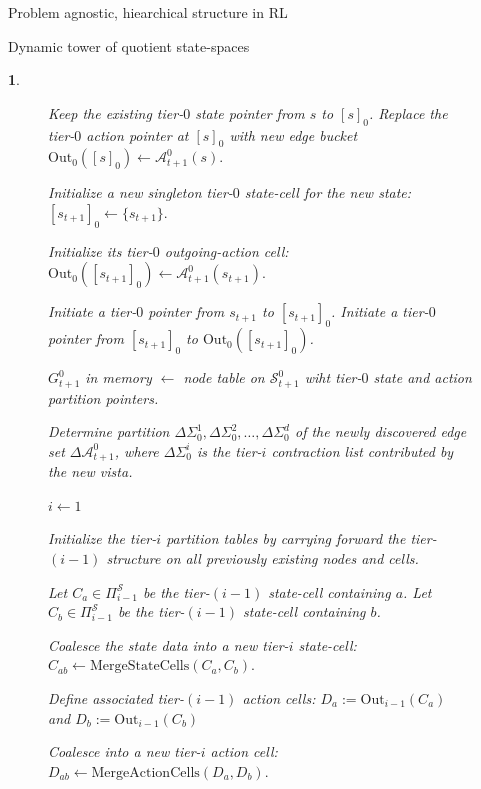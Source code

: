 \documentclass[11pt]{article}
\newtheorem{ermark}[subsubsection]{}
\begin{document}
\begin{section}{Problem agnostic, hiearchical structure in RL}
\begin{subsection}{Dynamic tower of quotient state-spaces}
\begin{ermark}
\begin{figure}[!h]
\begin{algorithm}[H]
\begin{algorithmic}[1]
        \State Keep the existing tier-$0$ state pointer from $s$ to $[s]_0$.
        \State Replace the tier-$0$ action pointer at $[s]_0$ with new edge bucket
        $
        \mathrm{Out}_0([s]_0)\gets \mathcal{A}_{t+1}^0(s).
        $
    \EndFor

    \State Initialize a new singleton tier-$0$ state-cell for the new state:
    $
    [s_{t+1}]_0\gets \{s_{t+1}\}.
    $

    \State Initialize its tier-$0$ outgoing-action cell:
    $
    \mathrm{Out}_0([s_{t+1}]_0)\gets \mathcal{A}_{t+1}^0(s_{t+1}).
    $

    \State Initiate a tier-$0$ pointer from $s_{t+1}$ to $[s_{t+1}]_0$.
    \State Initiate a tier-$0$ pointer from $[s_{t+1}]_0$ to $\mathrm{Out}_0([s_{t+1}]_0)$.

    \State $G_{t+1}^0$ in memory $\gets$ node table on $\mathcal{S}_{t+1}^0$ wiht tier-$0$ state and action partition pointers.

    \State Determine partition
    $
    \Delta\Sigma_0^1,\Delta\Sigma_0^2,\dots,\Delta\Sigma_0^d
    $
    of the newly discovered edge set $\Delta\mathcal{A}_{t+1}^0$, where $\Delta\Sigma_0^i$ is the tier-$i$ contraction list contributed by the new vista.


    \State $i \gets 1$

        \State Initialize the tier-$i$ partition tables by carrying forward the tier-$(i-1)$ structure on all previously existing nodes and cells.

            \State Let $C_a\in\Pi_{i-1}^{\mathcal S}$ be the tier-$(i-1)$ state-cell containing $a$.
            \State Let $C_b\in\Pi_{i-1}^{\mathcal S}$ be the tier-$(i-1)$ state-cell containing $b$.

                \State Coalesce the state data into a new tier-$i$ state-cell:
                $
                C_{ab}\gets \mathrm{MergeStateCells}(C_a,C_b).
                $

                \State Define associated tier-$(i-1)$ action cells: $D_a:=\mathrm{Out}_{i-1}(C_a)$ and $D_b:=\mathrm{Out}_{i-1}(C_b)$

                \State Coalesce into a new tier-$i$ action cell:
                $
                D_{ab}\gets \mathrm{MergeActionCells}(D_a,D_b).
                $


\end{algorithmic}
\end{algorithm}
\end{figure}
\end{ermark}
\end{subsection}
\end{section}
\end{document}
